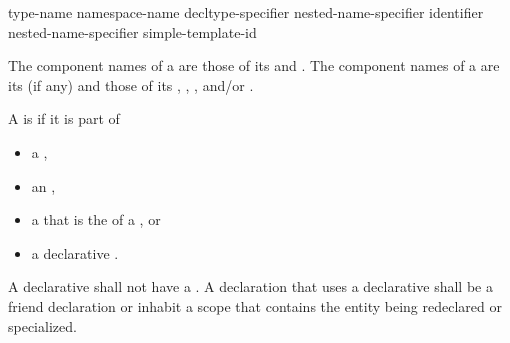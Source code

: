 %
%
%
\begin{bnf}
\br
    \terminal{::}\br
    type-name \terminal{::}\br
    namespace-name \terminal{::}\br
    decltype-specifier \terminal{::}\br
    nested-name-specifier identifier \terminal{::}\br
    nested-name-specifier  simple-template-id \terminal{::}
\end{bnf}

\pnum
{}%
The component names of a  are those of
its  and .
The component names of a  are
its  (if any) and those of its
,
,
, and/or
.

\pnum
A  is  if it is part of
\begin{itemize}
\item
a ,
\item
an ,
\item
a 
that is the  of a , or
\item
a declarative .
\end{itemize}
A declarative 
shall not have a .
A declaration that uses a declarative 
shall be a friend declaration or
inhabit a scope that contains the entity being redeclared or specialized.

